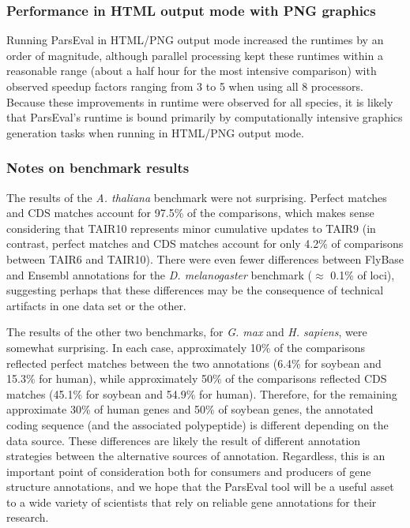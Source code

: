 \subsubsection{Performance in HTML output mode with PNG graphics}
Running ParsEval in HTML/PNG output mode increased the runtimes by an order of magnitude, although parallel processing kept these runtimes within a reasonable range (about a half hour for the most intensive comparison) with observed speedup factors ranging from 3 to 5 when using all 8 processors.
Because these improvements in runtime were observed for all species, it is likely that ParsEval's runtime is bound primarily by computationally intensive graphics generation tasks when running in HTML/PNG output mode.


\subsubsection{Notes on benchmark results}
The results of the \textit{A. thaliana} benchmark were not surprising.
Perfect matches and CDS matches account for 97.5\% of the comparisons, which makes sense considering that TAIR10 represents minor cumulative updates to TAIR9 (in contrast, perfect matches and CDS matches account for only 4.2\% of comparisons between TAIR6 and TAIR10).
There were even fewer differences between FlyBase and Ensembl annotations for the \textit{D. melanogaster} benchmark ($\approx$ 0.1\% of loci), suggesting perhaps that these differences may be the consequence of technical artifacts in one data set or the other.

The results of the other two benchmarks, for \textit{G. max} and \textit{H. sapiens}, were somewhat surprising.
In each case, approximately 10\% of the comparisons reflected perfect matches between the two annotations (6.4\% for soybean and 15.3\% for human), while approximately 50\% of the comparisons reflected CDS matches (45.1\% for soybean and 54.9\% for human).
Therefore, for the remaining approximate 30\% of human genes and 50\% of soybean genes, the annotated coding sequence (and the associated polypeptide) is different depending on the data source.
These differences are likely the result of different annotation strategies between the alternative sources of annotation.
Regardless, this is an important point of consideration both for consumers and producers of gene structure annotations, and we hope that the ParsEval tool will be a useful asset to a wide variety of scientists that rely on reliable gene annotations for their research.


